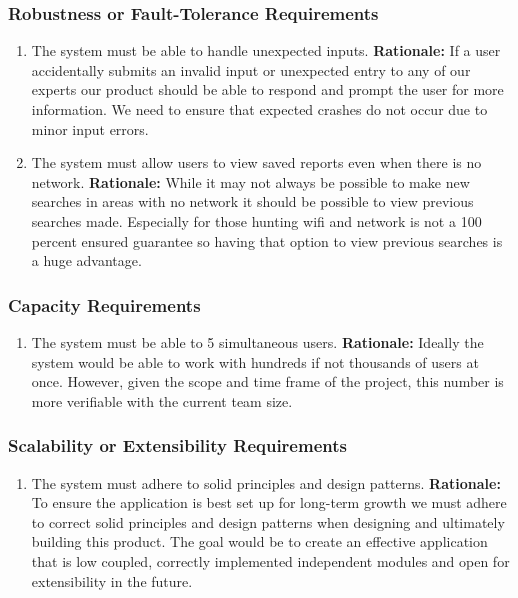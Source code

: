 \documentclass[]{article}
\begin{document}
\subsubsection{Robustness or Fault-Tolerance Requirements}
\label{ssub:robustness_or_fault_tolerance_requirements}
\begin{enumerate}[{PR-RFT}1. ]
	\item The system must be able to handle unexpected inputs. 
	\newline \textbf{Rationale:} If a user accidentally submits an invalid input or unexpected entry to any of our experts our product should be able to respond and prompt the user for more information. We need to ensure that expected crashes do not occur due to minor input errors. 
	\item The system must allow users to view saved reports even when there is no network.
	\newline \textbf{Rationale:} While it may not always be possible to make new searches in areas with no network it should be possible to view previous searches made. Especially for those hunting wifi and network is not a 100 percent ensured guarantee so having that option to view previous searches is a huge advantage. 
\end{enumerate}

\subsubsection{Capacity Requirements}
\label{ssub:capacity_requirements}
\begin{enumerate}[{PR-C}1. ]
	\item The system must be able to 5 simultaneous users.
	\newline \textbf{Rationale:} Ideally the system would be able to work with hundreds if not thousands of users at once. However, given the scope and time frame of the project, this number is more verifiable with the current team size. 
\end{enumerate}

\subsubsection{Scalability or Extensibility Requirements}
\label{ssub:scalability_or_extensibility_requirements}
\begin{enumerate}[{PR-SE}1. ]
	\item The system must adhere to solid principles and design patterns.
	\newline \textbf{Rationale:} To ensure the application is best set up for long-term growth we must adhere to correct solid principles and design patterns when designing and ultimately building this product. The goal would be to create an effective application that is low coupled, correctly implemented independent modules and open for extensibility in the future. 
\end{enumerate}
\end{document}
